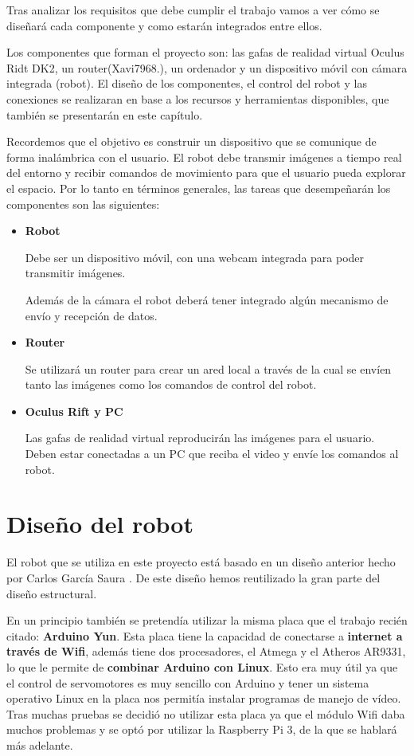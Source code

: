 \documentclass[twoside, 11pt]{epstfg}
\begin{document}
Tras analizar los requisitos que debe cumplir el trabajo vamos a ver cómo se diseñará cada componente y como estarán integrados entre ellos.

Los componentes que forman el proyecto son: las gafas de realidad virtual Oculus Ridt DK2, un router(Xavi7968.), un ordenador y un dispositivo móvil con cámara integrada (robot).
El diseño de los componentes, el control del robot y las conexiones se realizaran en base a los recursos y herramientas disponibles, que también se presentarán en este capítulo.

Recordemos que el objetivo es construir un dispositivo que se comunique de forma inalámbrica con el usuario. El robot debe transmir imágenes a tiempo real del entorno y recibir comandos de movimiento para que el usuario pueda explorar el espacio.
Por lo tanto en términos generales, las tareas que desempeñarán los componentes son las siguientes:
\begin{itemize}
	\item \textbf{Robot} 
	
		Debe ser un dispositivo móvil, con una webcam integrada para poder transmitir imágenes.
		
		Además de la cámara el robot deberá tener integrado algún mecanismo de envío y recepción de datos.
	\item \textbf{Router}
	
		Se utilizará un router para crear un ared local a través de la cual se envíen tanto las imágenes como los comandos de control del robot.
	\item \textbf{Oculus Rift y PC}
		
		Las gafas de realidad virtual reproducirán las imágenes para el usuario. Deben estar conectadas a un PC que reciba el video y envíe los comandos al robot.
		
\end{itemize}


\section{Diseño del robot}

El robot que se utiliza en este proyecto está basado en un diseño anterior hecho por Carlos García Saura \cite{garcia2012low}. De este diseño hemos reutilizado la gran parte del diseño estructural.

En un principio también se pretendía utilizar la misma placa que el trabajo recién citado: \textbf{Arduino Yun}.
Esta placa tiene la capacidad de conectarse a \textbf{internet a través de Wifi}, además tiene dos procesadores, el Atmega y el Atheros AR9331, lo que le permite de \textbf{combinar Arduino con Linux}. Esto era muy útil ya que el control de servomotores es muy sencillo con Arduino y tener un sistema operativo Linux en la placa nos permitía instalar programas de manejo de vídeo.
Tras muchas pruebas se decidió no utilizar esta placa ya que el módulo Wifi daba muchos problemas y se optó por utilizar la Raspberry Pi 3, de la que se hablará más adelante.
\end{document}

